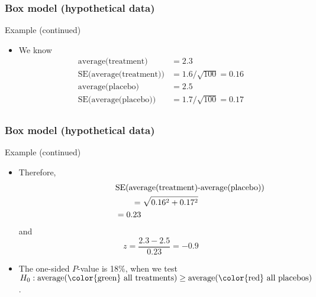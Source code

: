 \documentclass[handout]{beamer}
\begin{document}
   \begin{frame} \frametitle{Box model (hypothetical data)}

   \begin{block}
   {Example (continued)}

   \begin{itemize}
   \item We know
     $$
     \begin{aligned}
     \text{average(treatment)} &= 2.3 \\
     \text{SE(average(treatment))} &= 1.6 / \sqrt{100} = 0.16 \\
     \text{average(placebo)} &= 2.5 \\
     \text{SE(average(placebo))} &= 1.7 / \sqrt{100} = 0.17 \\
     \end{aligned}
     $$

   \end{itemize}
   \end{block}
   \end{frame}


   \begin{frame} \frametitle{Box model (hypothetical data)}

   \begin{block}
   {Example (continued)}

   \begin{itemize}


   \item Therefore,
     $$
     \begin{aligned}
     \lefteqn{\text{SE(average(treatment)-average(placebo))}} \\
     & \qquad = \sqrt{0.16^2+0.17^2} \\
     &= 0.23
     \end{aligned}
     $$
     and
     $$
     z = \frac{2.3-2.5}{0.23} = -0.9
     $$
     \item The one-sided $P$-value is 18\%, when we test
     $H_0: \text{average({\color{green} all treatments})} \geq \text{average({\color{red} all placebos})}$.
   \end{itemize}
   \end{block}
   \end{frame}

\end{document}
